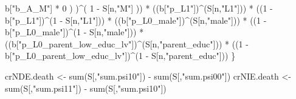 \documentclass[
]{book}
\newenvironment{Shaded}{\begin{snugshade}}{\end{snugshade}}
\newcommand{\DecValTok}[1]{\textcolor[rgb]{0.00,0.00,0.81}{#1}}
\newcommand{\FunctionTok}[1]{\textcolor[rgb]{0.00,0.00,0.00}{#1}}
\newcommand{\NormalTok}[1]{#1}
\newcommand{\OtherTok}[1]{\textcolor[rgb]{0.56,0.35,0.01}{#1}}
\newcommand{\SpecialCharTok}[1]{\textcolor[rgb]{0.00,0.00,0.00}{#1}}
\newcommand{\StringTok}[1]{\textcolor[rgb]{0.31,0.60,0.02}{#1}}
\begin{document}
\begin{Shaded}
\begin{Highlighting}[]
\NormalTok{                b[}\StringTok{"b\_A\_M"}\NormalTok{] }\SpecialCharTok{*} \DecValTok{0}\NormalTok{ ) )}\SpecialCharTok{\^{}}\NormalTok{( }\DecValTok{1} \SpecialCharTok{{-}}\NormalTok{ S[n,}\StringTok{"M"}\NormalTok{] )) }\SpecialCharTok{*}
\NormalTok{      ((b[}\StringTok{"p\_L1"}\NormalTok{])}\SpecialCharTok{\^{}}\NormalTok{(S[n,}\StringTok{"L1"}\NormalTok{])) }\SpecialCharTok{*}
\NormalTok{      ((}\DecValTok{1} \SpecialCharTok{{-}}\NormalTok{ b[}\StringTok{"p\_L1"}\NormalTok{])}\SpecialCharTok{\^{}}\NormalTok{(}\DecValTok{1} \SpecialCharTok{{-}}\NormalTok{ S[n,}\StringTok{"L1"}\NormalTok{])) }\SpecialCharTok{*}
\NormalTok{      ((b[}\StringTok{"p\_L0\_male"}\NormalTok{])}\SpecialCharTok{\^{}}\NormalTok{(S[n,}\StringTok{"male"}\NormalTok{])) }\SpecialCharTok{*} 
\NormalTok{      ((}\DecValTok{1} \SpecialCharTok{{-}}\NormalTok{ b[}\StringTok{"p\_L0\_male"}\NormalTok{])}\SpecialCharTok{\^{}}\NormalTok{(}\DecValTok{1} \SpecialCharTok{{-}}\NormalTok{ S[n,}\StringTok{"male"}\NormalTok{])) }\SpecialCharTok{*} 
\NormalTok{      ((b[}\StringTok{"p\_L0\_parent\_low\_educ\_lv"}\NormalTok{])}\SpecialCharTok{\^{}}\NormalTok{(S[n,}\StringTok{"parent\_educ"}\NormalTok{])) }\SpecialCharTok{*}
\NormalTok{      ((}\DecValTok{1} \SpecialCharTok{{-}}\NormalTok{ b[}\StringTok{"p\_L0\_parent\_low\_educ\_lv"}\NormalTok{])}\SpecialCharTok{\^{}}\NormalTok{(}\DecValTok{1} \SpecialCharTok{{-}}\NormalTok{ S[n,}\StringTok{"parent\_educ"}\NormalTok{]))}
\NormalTok{    \}}
  
\NormalTok{  crNDE.death }\OtherTok{\textless{}{-}} \FunctionTok{sum}\NormalTok{(S[,}\StringTok{"sum.psi10"}\NormalTok{]) }\SpecialCharTok{{-}} \FunctionTok{sum}\NormalTok{(S[,}\StringTok{"sum.psi00"}\NormalTok{])}
\NormalTok{  crNIE.death }\OtherTok{\textless{}{-}} \FunctionTok{sum}\NormalTok{(S[,}\StringTok{"sum.psi11"}\NormalTok{]) }\SpecialCharTok{{-}} \FunctionTok{sum}\NormalTok{(S[,}\StringTok{"sum.psi10"}\NormalTok{])}
  

\end{Highlighting}
\end{Shaded}
\end{document}
